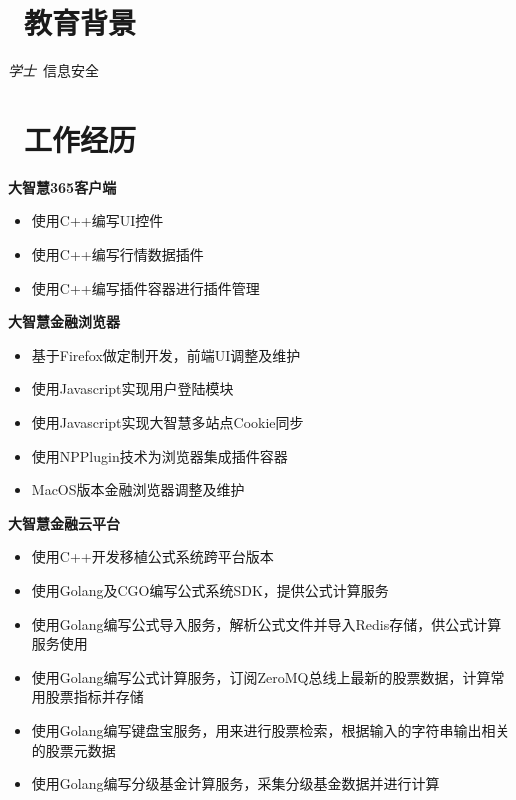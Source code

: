 \documentclass{resume}
\begin{document}



\section{\faGraduationCap\ 教育背景}
\textit{学士}\ 信息安全

\section{\faUsers\ 工作经历}

\begin{onehalfspacing}
    \textbf{大智慧365客户端}
    \begin{itemize}
        \item 使用C++编写UI控件
        \item 使用C++编写行情数据插件
        \item 使用C++编写插件容器进行插件管理
    \end{itemize}
\end{onehalfspacing}

\begin{onehalfspacing}
    \textbf{大智慧金融浏览器}
    \begin{itemize}
        \item 基于Firefox做定制开发，前端UI调整及维护
        \item 使用Javascript实现用户登陆模块
        \item 使用Javascript实现大智慧多站点Cookie同步
        \item 使用NPPlugin技术为浏览器集成插件容器
        \item MacOS版本金融浏览器调整及维护
    \end{itemize}
\end{onehalfspacing}

\begin{onehalfspacing}
    \textbf{大智慧金融云平台}
    \begin{itemize}
        \item 使用C++开发移植公式系统跨平台版本
        \item 使用Golang及CGO编写公式系统SDK，提供公式计算服务
        \item 使用Golang编写公式导入服务，解析公式文件并导入Redis存储，供公式计算服务使用
        \item 使用Golang编写公式计算服务，订阅ZeroMQ总线上最新的股票数据，计算常用股票指标并存储
        \item 使用Golang编写键盘宝服务，用来进行股票检索，根据输入的字符串输出相关的股票元数据
        \item 使用Golang编写分级基金计算服务，采集分级基金数据并进行计算
    \end{itemize}
\end{onehalfspacing}
\end{document}
